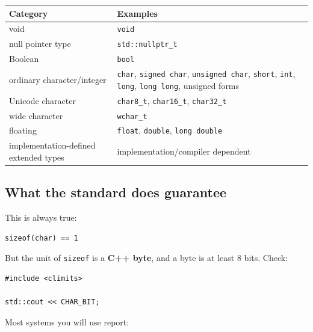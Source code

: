 {\def\LTcaptype{none} %
\begin{longtable}[]{@{}
  >{\raggedright\arraybackslash}p{}
  >{\raggedright\arraybackslash}p{}@{}}
\toprule\noalign{}
\begin{minipage}[b]{\linewidth}\raggedright
Category
\end{minipage} & \begin{minipage}[b]{\linewidth}\raggedright
Examples
\end{minipage} \\
\midrule\noalign{}
\endhead
\bottomrule\noalign{}
\endlastfoot
void & \texttt{void} \\
null pointer type & \texttt{std::nullptr\_t} \\
Boolean & \texttt{bool} \\
ordinary character/integer & \texttt{char}, \texttt{signed\ char}, \texttt{unsigned\ char}, \texttt{short}, \texttt{int}, \texttt{long}, \texttt{long\ long}, unsigned forms \\
Unicode character & \texttt{char8\_t}, \texttt{char16\_t}, \texttt{char32\_t} \\
wide character & \texttt{wchar\_t} \\
floating & \texttt{float}, \texttt{double}, \texttt{long\ double} \\
implementation-defined extended types & implementation/compiler dependent \\
\end{longtable}
}

\subsection{What the standard does guarantee}\label{01-foundations-i-ch002-what-the-standard-does-guarantee}

This is always true:

\begin{verbatim}
sizeof(char) == 1
\end{verbatim}

But the unit of \texttt{sizeof} is a \textbf{C++ byte}, and a byte is at least 8 bits. Check:

\begin{verbatim}
#include <climits>

std::cout << CHAR_BIT;
\end{verbatim}

Most systems you will use report:


